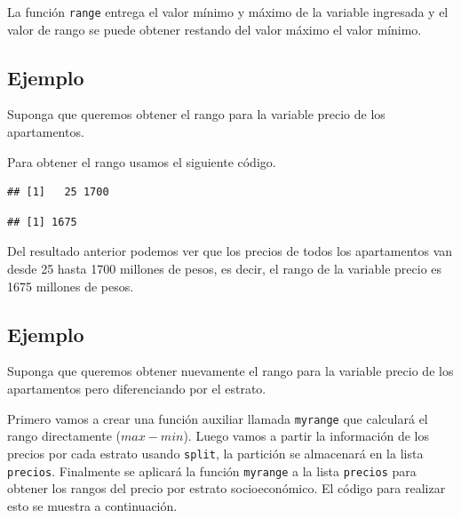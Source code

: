 \documentclass[10pt,]{krantz}
\makeatletter
\newenvironment{Shaded}{\begin{snugshade}}{\end{snugshade}}
\newcommand{\KeywordTok}[1]{\textcolor[rgb]{0.13,0.29,0.53}{\textbf{{#1}}}}
\newcommand{\StringTok}[1]{\textcolor[rgb]{0.31,0.60,0.02}{{#1}}}
\newcommand{\NormalTok}[1]{{#1}}
\newenvironment{kframe}{%
\medskip{}
\setlength{\fboxsep}{.8em}
 \def\at@end@of@kframe{}%
 \ifinner\ifhmode%
  \def\at@end@of@kframe{\end{minipage}}%
  \begin{minipage}{\columnwidth}%
 \fi\fi%
 \def\FrameCommand##1{\hskip\@totalleftmargin \hskip-\fboxsep
 \colorbox{shadecolor}{##1}\hskip-\fboxsep
     \hskip-\linewidth \hskip-\@totalleftmargin \hskip\columnwidth}%
 \MakeFramed {\advance\hsize-\width
   \@totalleftmargin\z@ \linewidth\hsize
   \@setminipage}}%
 {\par\unskip\endMakeFramed%
 \at@end@of@kframe}
\renewenvironment{Shaded}{\begin{kframe}}{\end{kframe}}
\makeatother
\begin{document}
La función \texttt{range} entrega el valor mínimo y máximo de la
variable ingresada y el valor de rango se puede obtener restando del
valor máximo el valor mínimo.

\subsection*{Ejemplo}\label{ejemplo-35}


Suponga que queremos obtener el rango para la variable precio de los
apartamentos.

Para obtener el rango usamos el siguiente código.

\begin{Shaded}
\end{Shaded}

\begin{verbatim}
## [1]   25 1700
\end{verbatim}

\begin{Shaded}
\end{Shaded}

\begin{verbatim}
## [1] 1675
\end{verbatim}

Del resultado anterior podemos ver que los precios de todos los
apartamentos van desde 25 hasta 1700 millones de pesos, es decir, el
rango de la variable precio es 1675 millones de pesos.

\subsection*{Ejemplo}\label{ejemplo-36}


Suponga que queremos obtener nuevamente el rango para la variable precio
de los apartamentos pero diferenciando por el estrato.

Primero vamos a crear una función auxiliar llamada \texttt{myrange} que
calculará el rango directamente (\(max - min\)). Luego vamos a partir la
información de los precios por cada estrato usando \texttt{split}, la
partición se almacenará en la lista \texttt{precios}. Finalmente se
aplicará la función \texttt{myrange} a la lista \texttt{precios} para
obtener los rangos del precio por estrato socioeconómico. El código para
realizar esto se muestra a continuación.
\end{document}

